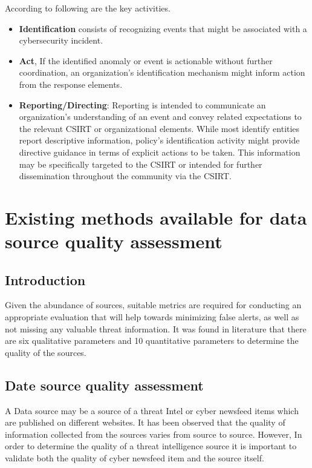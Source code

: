 According to \cite{osorno2011coordinated} following are the key activities.
\begin{itemize}
    \item \textbf{Identification} consists of recognizing events that might be associated with a cybersecurity incident. 
    \item \textbf{Act}, If the identified anomaly or event is actionable without further coordination, an organization’s identification mechanism might inform action from the response elements. 
    \item\textbf{Reporting/Directing}: Reporting is intended to communicate an organization’s understanding of an event and convey related expectations to the relevant CSIRT or organizational elements. While most identify entities report descriptive information, policy’s identification activity might provide directive guidance in terms of explicit actions to be taken. This information may be specifically targeted to the CSIRT or intended for further dissemination throughout the community via the CSIRT. 

\end{itemize}

\section{Existing methods available for data source quality assessment}
\label{Existing methods available for data source quality assessment}

\subsection{Introduction}

Given the abundance of sources, suitable metrics are required for conducting an appropriate evaluation that will help towards minimizing false alerts, as well as not missing any valuable threat information. It was found in literature that there are six qualitative parameters and 10 quantitative parameters to determine the quality of the sources.

\subsection{Date source quality assessment}

A Data source may be a source of a threat Intel or cyber newsfeed items which are published on different websites. It has been observed that the quality of information collected from the sources varies from source to source. However,  In order to determine  the quality of a threat intelligence source it is important to validate both the quality of cyber newsfeed item and the source itself. 

